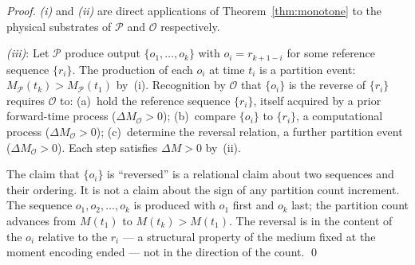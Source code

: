 \documentclass[twocolumn,10pt,a4paper]{article}
\theoremstyle{thmstyle}
\theoremstyle{definition}
\theoremstyle{remark}
\begin{document}
\begin{proof}
\textit{(i)} and \textit{(ii)} are direct applications of Theorem~\ref{thm:monotone} to the physical substrates of $\mathcal{P}$ and $\mathcal{O}$ respectively.

\textit{(iii)}: Let $\mathcal{P}$ produce output $\{o_1, \ldots, o_k\}$ with $o_i = r_{k+1-i}$ for some reference sequence $\{r_i\}$. The production of each $o_i$ at time $t_i$ is a partition event: $M_{\mathcal{P}}(t_k) > M_{\mathcal{P}}(t_1)$ by~(i). Recognition by $\mathcal{O}$ that $\{o_i\}$ is the reverse of $\{r_i\}$ requires $\mathcal{O}$ to: (a)~hold the reference sequence $\{r_i\}$, itself acquired by a prior forward-time process ($\Delta M_{\mathcal{O}} > 0$); (b)~compare $\{o_i\}$ to $\{r_i\}$, a computational process ($\Delta M_{\mathcal{O}} > 0$); (c)~determine the reversal relation, a further partition event ($\Delta M_{\mathcal{O}} > 0$). Each step satisfies $\Delta M > 0$ by~(ii).

The claim that $\{o_i\}$ is ``reversed'' is a relational claim about two sequences and their ordering. It is not a claim about the sign of any partition count increment. The sequence $o_1, o_2, \ldots, o_k$ is produced with $o_1$ first and $o_k$ last; the partition count advances from $M(t_1)$ to $M(t_k) > M(t_1)$. The reversal is in the content of the $o_i$ relative to the $r_i$ --- a structural property of the medium fixed at the moment encoding ended --- not in the direction of the count. \qed
\end{proof}
\end{document}
